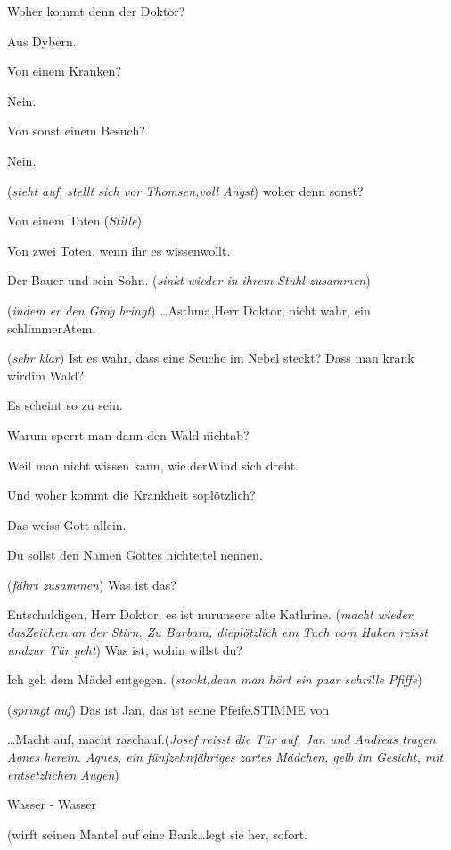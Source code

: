 \documentclass[
	final,
	a4paper,
	ngerman,
	mpinclude = true, %
	twoside = true,
	open = right,
	cleardoublepage = plain,
	DIV = 13,
	BCOR = 1cm,
	titlepage = firstiscover,
	]{scrbook}
\newcommand{\direction}[1]{(\textit{#1})}
\newcommand{\thecharacter}[1]{\textup{\textsc{#1}}\xspace}
\newcommand{\theBarbara}{\thecharacter{Barbara}}
\newcommand{\theJosef}{\thecharacter{Josef}}
\newcommand{\theKathrine}{\thecharacter{Kathrine}}
\newcommand{\theGregor}{\thecharacter{Gregor}}
\newcommand{\theAndreas}{\thecharacter{Andreas}}
\newcommand{\theLuise}{\thecharacter{Luise}}
\newcommand{\theAgnes}{\thecharacter{Agnes}}
\newcommand{\theThomsen}{\thecharacter{Doktor Thomsen}}
\newcommand{\character}[1]{\item[#1]}
\newcommand{\Barbara}{\character{\theBarbara}}
\newcommand{\Josef}{\character{\theJosef}}
\newcommand{\Kathrine}{\character{\theKathrine}}
\newcommand{\Gregor}{\character{\theGregor}}
\newcommand{\Andreas}{\character{\theAndreas}}
\newcommand{\Luise}{\character{\theLuise}}
\newcommand{\Agnes}{\character{\theAgnes}}
\newcommand{\Thomsen}{\character{\theThomsen}}
\begin{document}
\begin{play}
\Barbara
Woher kommt denn der Doktor?

\Thomsen
Aus Dybern.

\Luise
Von einem Kranken?

\Thomsen
Nein.

\Gregor
Von sonst einem Besuch?

\Thomsen
Nein.

\Barbara
\direction{steht auf, stellt sich vor Thomsen,voll Angst} woher denn sonst?

\Thomsen
Von einem Toten.\direction{Stille}

\Thomsen
Von zwei Toten, wenn ihr es wissenwollt.

\Barbara
Der Bauer und sein Sohn. \direction{sinkt wieder in ihrem Stuhl zusammen}

\Josef
\direction{indem er den Grog bringt} \ldots Asthma,Herr Doktor, nicht wahr, ein schlimmerAtem.

\Luise
\direction{sehr klar} Ist es wahr, dass eine Seuche im Nebel steckt? Dass man krank wirdim Wald?

\Thomsen
Es scheint so zu sein.

\Luise
Warum sperrt man dann den Wald nichtab?

\Thomsen
Weil man nicht wissen kann, wie derWind sich dreht.

\Gregor
Und woher kommt die Krankheit soplötzlich?

\Thomsen
Das weiss Gott allein.

\Kathrine
Du sollst den Namen Gottes nichteitel nennen.

\Thomsen
\direction{fährt zusammen} Was ist das?

\Josef
Entschuldigen, Herr Doktor, es ist nurunsere alte Kathrine. \direction{macht wieder dasZeichen an der Stirn. Zu Barbara, dieplötzlich ein Tuch vom Haken reisst undzur Tür geht} Was ist, wohin willst du?

\Barbara
Ich geh dem Mädel entgegen. \direction{stockt,denn man hört ein paar schrille Pfiffe}

\Luise
\direction{springt auf} Das ist Jan, das ist seine Pfeife.STIMME von

\Andreas
\ldots Macht auf, macht raschauf.\direction{Josef reisst die Tür auf, Jan und Andreas tragen Agnes herein. Agnes, ein fünfzehnjähriges zartes Mädchen, gelb im Gesicht, mit entsetzlichen Augen}

\Agnes
Wasser - Wasser

\Thomsen
(wirft seinen Mantel auf eine Bank\ldots legt sie her, sofort.


\end{play}
\end{document}

